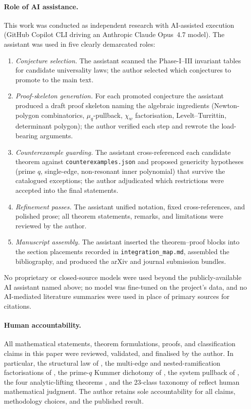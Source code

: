 \documentclass[11pt,a4paper]{article}
\theoremstyle{plain}
\theoremstyle{definition}
\theoremstyle{remark}
\begin{document}
\paragraph{Role of AI assistance.}
This work was conducted as independent research with AI-assisted
execution (GitHub Copilot CLI driving an Anthropic Claude Opus~4.7
model). The assistant was used in five clearly demarcated roles:
\begin{enumerate}[label=(\roman*),leftmargin=2em,itemsep=2pt,topsep=2pt]
\item \emph{Conjecture selection.} The assistant scanned the
  Phase-I--III invariant tables for candidate universality laws; the
  author selected which conjectures to promote to the main text.
\item \emph{Proof-skeleton generation.} For each promoted conjecture
  the assistant produced a draft proof skeleton naming the algebraic
  ingredients (Newton-polygon combinatorics, $\mu_q$-pullback,
  $\chi_w$ factorisation, Levelt--Turrittin, determinant polygon);
  the author verified each step and rewrote the load-bearing
  arguments.
\item \emph{Counterexample guarding.} The assistant cross-referenced
  each candidate theorem against \texttt{counterexamples.json} and
  proposed genericity hypotheses (prime $q$, single-edge, non-resonant
  inner polynomial) that survive the catalogued exceptions; the
  author adjudicated which restrictions were accepted into the final
  statements.
\item \emph{Refinement passes.} The assistant unified notation, fixed
  cross-references, and polished prose; all theorem statements,
  remarks, and limitations were reviewed by the author.
\item \emph{Manuscript assembly.} The assistant inserted the
  theorem--proof blocks into the section placements recorded in
  \texttt{integration\_map.md}, assembled the bibliography, and
  produced the arXiv and journal submission bundles.
\end{enumerate}
No proprietary or closed-source models were used beyond the
publicly-available AI assistant named above; no model was fine-tuned on
the project's data, and no AI-mediated literature summaries were used
in place of primary sources for citations.

\paragraph{Human accountability.}
All mathematical statements, theorem formulations, proofs, and
classification claims in this paper were reviewed, validated, and
finalised by the author. In particular, the structural law of
, the multi-edge and nested-ramification factorisations
of , the prime-$q$ Kummer dichotomy of
, the system pullback of , the four
analytic-lifting theorems , and
the 23-class taxonomy of  reflect human mathematical
judgment. The author retains sole accountability for all claims,
methodology choices, and the published result.
\end{document}

